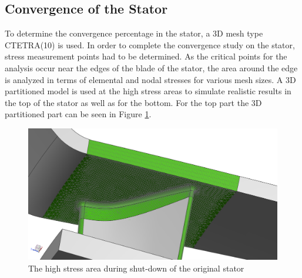 \subsection*{Convergence of the Stator}
To determine the convergence percentage in the stator, a 3D mesh type CTETRA(10) is used. In order to complete the convergence study on the stator, stress measurement points had to be determined. As the critical points for the analysis occur near the edges of the blade of the stator, the area around the edge is analyzed in terms of elemental and nodal stresses for various mesh sizes. A 3D partitioned model is used at the high stress areas to simulate realistic results in the top of the stator as well as for the bottom. For the top part the 3D partitioned part can be seen in Figure \ref{partitiontop}.

\begin{figure}[H]
\centering
\includegraphics[width=12cm]{Figures/partition_part.png}
\caption{The high stress area during shut-down of the original stator}
\label{partitiontop}
\end{figure}

